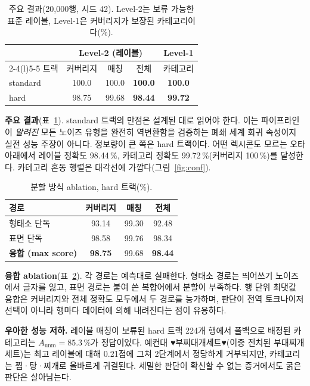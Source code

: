 \documentclass[10pt,twocolumn]{article}
\begin{document}
\begin{table}[t]
\centering
\small
\caption{주요 결과(20{,}000행, 시드 42). Level-2는 보류 가능한 표준
레이블, Level-1은 커버리지가 보장된 카테고리이다(\%).}
\label{tab:main}
\begin{tabular}{@{}lcccc@{}}
\toprule
& \multicolumn{3}{c}{Level-2 (레이블)} & Level-1 \\
\cmidrule(lr){2-4}\cmidrule(l){5-5}
트랙 & 커버리지 & 매칭 & 전체 & 카테고리 \\
\midrule
standard & 100.0 & 100.0 & \textbf{100.0} & \textbf{100.0} \\
hard     & 98.75 & 99.68 & \textbf{98.44} & \textbf{99.72} \\
\bottomrule
\end{tabular}
\end{table}

\textbf{주요 결과}(표~\ref{tab:main}). standard 트랙의 만점은 설계된
대로 읽어야 한다. 이는 파이프라인이 \emph{알려진} 모든 노이즈 유형을
완전히 역변환함을 검증하는 폐쇄 세계 회귀 속성이지 실전 성능 주장이
아니다. 정보량이 큰 쪽은 hard 트랙이다. 어떤 렉시콘도 모르는 오타
아래에서 레이블 정확도 98.44\,\%, 카테고리 정확도 99.72\,\%(커버리지
100\,\%)를 달성한다. 카테고리 혼동 행렬은 대각선에
가깝다(그림~\ref{fig:conf}).

\begin{table}[t]
\centering
\small
\caption{분할 방식 ablation, hard 트랙(\%).}
\label{tab:ablation}
\begin{tabular}{@{}lccc@{}}
\toprule
경로 & 커버리지 & 매칭 & 전체 \\
\midrule
형태소 단독 & 93.14 & 99.30 & 92.48 \\
표면 단독   & 98.58 & 99.76 & 98.34 \\
\textbf{융합 (max score)} & \textbf{98.75} & 99.68 & \textbf{98.44} \\
\bottomrule
\end{tabular}
\end{table}

\textbf{융합 ablation}(표~\ref{tab:ablation}). 각 경로는 예측대로
실패한다. 형태소 경로는 띄어쓰기 노이즈에서 글자를 잃고, 표면 경로는
붙여 쓴 복합어에서 분할이 부족하다. 행 단위 최댓값 융합은 커버리지와
전체 정확도 모두에서 두 경로를 능가하며, 판단이 전역 토크나이저 선택이
아니라 행마다 데이터에 의해 내려진다는 점이 유용하다.

\textbf{우아한 성능 저하.} 레이블 매칭이 보류된 hard 트랙 224개 행에서
폴백으로 배정된 카테고리는 $A_{\text{unm}}{=}85.3\,\%$가 정답이었다.
예컨대 \mbox{♥부찌대개세트♥}(이중 전치된 부대찌개 세트)는 최고 레이블에
대해 0.21점에 그쳐 2단계에서 정당하게 거부되지만, 카테고리는
찜·탕·찌개로 올바르게 귀결된다. 세밀한 판단이 확신할 수 없는 증거에서도
굵은 판단은 살아남는다.
\end{document}
